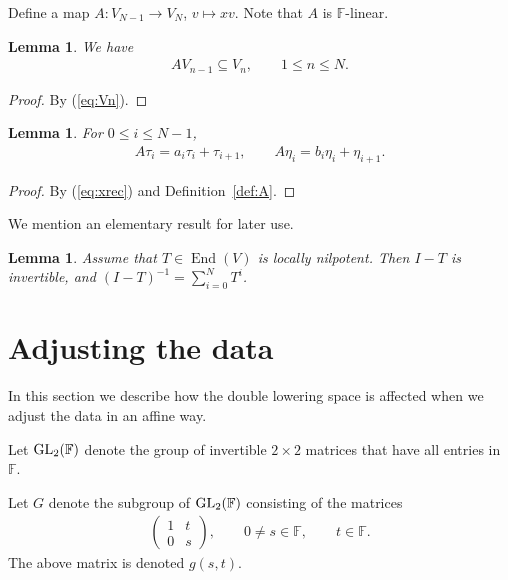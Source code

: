 \documentclass[pdftex]{sigma}
\numberwithin{equation}{section}
\newtheorem{Lemma}[Theorem]{Lemma}
\begin{document}
\begin{Definition}\label{def:A}
Define a map $A\colon V_{N-1} \to V_N$, $v \mapsto x v$.
Note that $A$ is $\mathbb F$-linear.
\end{Definition}

\begin{Lemma} We have
\begin{gather*}
A V_{n-1} \subseteq V_n, \qquad 1 \leq n \leq N.
\end{gather*}
\end{Lemma}
\begin{proof} By
(\ref{eq:Vn}).
\end{proof}
\begin{Lemma}\label{lem:Ataui}
For $0 \leq i \leq N-1$,
\begin{gather*}
A \tau_i = a_i \tau_i + \tau_{i+1},
\qquad
A \eta_i = b_i \eta_i + \eta_{i+1}.
\end{gather*}
\end{Lemma}
\begin{proof} By
(\ref{eq:xrec})
and
Definition~\ref{def:A}.
\end{proof}

We mention an elementary result for later use.
\begin{Lemma}\label{lem:gs}
Assume that $T \in \operatorname{End}(V)$
is locally nilpotent. Then $I-T$ is invertible, and $(I-T)^{-1}= \sum_{i=0}^N T^i$.
\end{Lemma}

\section{Adjusting the data}\label{section3}

In this section we describe how the double lowering space is affected when we adjust the data in an affine way.

Let ${\rm GL}_2(\mathbb F)$ denote the group of
invertible $2\times 2$ matrices that have all entries in $\mathbb F$.
\begin{Definition}\label{def:G}
Let $G$ denote the subgroup of
${\rm GL}_2(\mathbb F)$ consisting of the matrices
\begin{gather*}
	 \left(
	 \begin{matrix}
	 1 & t \\
	 0 & s
		 \end{matrix}
		 \right),
\qquad 0 \not=s\in \mathbb F, \qquad t \in \mathbb F.
\end{gather*}
The above matrix is denoted $g(s,t)$.
\end{Definition}
\end{document}

